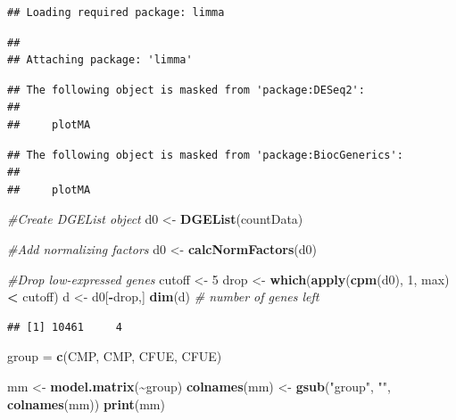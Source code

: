 \documentclass[
]{article}
\newenvironment{Shaded}{\begin{snugshade}}{\end{snugshade}}
\newcommand{\CommentTok}[1]{\textcolor[rgb]{0.56,0.35,0.01}{\textit{#1}}}
\newcommand{\DecValTok}[1]{\textcolor[rgb]{0.00,0.00,0.81}{#1}}
\newcommand{\FunctionTok}[1]{\textcolor[rgb]{0.13,0.29,0.53}{\textbf{#1}}}
\newcommand{\NormalTok}[1]{#1}
\newcommand{\OtherTok}[1]{\textcolor[rgb]{0.56,0.35,0.01}{#1}}
\newcommand{\SpecialCharTok}[1]{\textcolor[rgb]{0.81,0.36,0.00}{\textbf{#1}}}
\newcommand{\StringTok}[1]{\textcolor[rgb]{0.31,0.60,0.02}{#1}}
\begin{document}
\begin{verbatim}
## Loading required package: limma
\end{verbatim}

\begin{verbatim}
## 
## Attaching package: 'limma'
\end{verbatim}

\begin{verbatim}
## The following object is masked from 'package:DESeq2':
## 
##     plotMA
\end{verbatim}

\begin{verbatim}
## The following object is masked from 'package:BiocGenerics':
## 
##     plotMA
\end{verbatim}

\begin{Shaded}
\begin{Highlighting}[]
\CommentTok{\#Create DGEList object}
\NormalTok{d0 }\OtherTok{\textless{}{-}} \FunctionTok{DGEList}\NormalTok{(countData)}

\CommentTok{\#Add normalizing factors}
\NormalTok{d0 }\OtherTok{\textless{}{-}} \FunctionTok{calcNormFactors}\NormalTok{(d0)}

\CommentTok{\#Drop low{-}expressed genes}
\NormalTok{cutoff }\OtherTok{\textless{}{-}} \DecValTok{5}
\NormalTok{drop }\OtherTok{\textless{}{-}} \FunctionTok{which}\NormalTok{(}\FunctionTok{apply}\NormalTok{(}\FunctionTok{cpm}\NormalTok{(d0), }\DecValTok{1}\NormalTok{, max) }\SpecialCharTok{\textless{}}\NormalTok{ cutoff)}
\NormalTok{d }\OtherTok{\textless{}{-}}\NormalTok{ d0[}\SpecialCharTok{{-}}\NormalTok{drop,] }
\FunctionTok{dim}\NormalTok{(d) }\CommentTok{\# number of genes left}
\end{Highlighting}
\end{Shaded}

\begin{verbatim}
## [1] 10461     4
\end{verbatim}

\begin{Shaded}
\begin{Highlighting}[]
\NormalTok{group }\OtherTok{=} \FunctionTok{c}\NormalTok{(}\StringTok{\textquotesingle{}CMP\textquotesingle{}}\NormalTok{, }\StringTok{\textquotesingle{}CMP\textquotesingle{}}\NormalTok{, }\StringTok{\textquotesingle{}CFUE\textquotesingle{}}\NormalTok{, }\StringTok{\textquotesingle{}CFUE\textquotesingle{}}\NormalTok{)}

\NormalTok{mm }\OtherTok{\textless{}{-}} \FunctionTok{model.matrix}\NormalTok{(}\SpecialCharTok{\textasciitilde{}}\NormalTok{group)}
\FunctionTok{colnames}\NormalTok{(mm) }\OtherTok{\textless{}{-}} \FunctionTok{gsub}\NormalTok{(}\StringTok{"group"}\NormalTok{, }\StringTok{""}\NormalTok{, }\FunctionTok{colnames}\NormalTok{(mm))}
\FunctionTok{print}\NormalTok{(mm)}
\end{Highlighting}
\end{Shaded}
\end{document}
